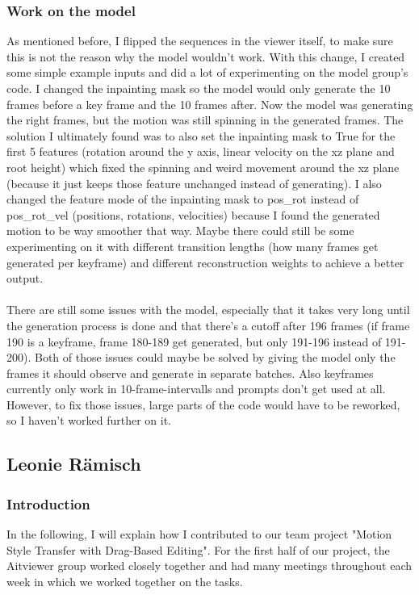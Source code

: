 \documentclass[a4paper]{scrartcl}
\begin{document}
\subsubsection*{Work on the model}
As mentioned before, I flipped the sequences in the viewer itself, to make sure this is not the reason why the model wouldn't work. With this change, I created some simple example inputs and did a lot of experimenting on the model group's code. I changed the inpainting mask so the model would only generate the 10 frames before a key frame and the 10 frames after. Now the model was generating the right frames, but the motion was still spinning in the generated frames. The solution I ultimately found was to also set the inpainting mask to True for the first 5 features (rotation around the y axis, linear velocity on the xz plane and root height) which fixed the spinning and weird movement around the xz plane (because it just keeps those feature unchanged instead of generating). I also changed the feature mode of the inpainting mask to pos\_rot instead of pos\_rot\_vel (positions, rotations, velocities) because I found the generated motion to be way smoother that way. Maybe there could still be some experimenting on it with different transition lengths (how many frames get generated per keyframe) and different reconstruction weights to achieve a better output.\\\\
There are still some issues with the model, especially that it takes very long until the generation process is done and that there's a cutoff after 196 frames (if frame 190 is a keyframe, frame 180-189 get generated, but only 191-196 instead of 191-200). Both of those issues could maybe be solved by giving the model only the frames it should observe and generate in separate batches. Also keyframes currently only work in 10-frame-intervalls and prompts don't get used at all. However, to fix those issues, large parts of the code would have to be reworked, so I haven't worked further on it.

\subsection*{Leonie Rämisch}
\subsubsection*{Introduction}
In the following, I will explain how I contributed to our team project "Motion Style Transfer with Drag-Based Editing". For the first half of our project, the Aitviewer group worked closely together and had many meetings throughout each week in which we worked together on the tasks. 
\end{document}
